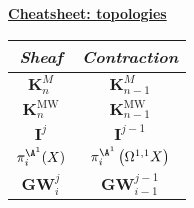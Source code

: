 \begin{mdframed}[style=cheatsheet]
\begin{center}

\underline{\textbf{Cheatsheet: topologies}}

        \begin{tabular}{| c | c |}
        \hline
        \textit{Sheaf} & \textit{Contraction} \\
        \hline
        $\mathbf{K}_n^M$ & $ \mathbf{K}_{n-1}^M$ \\
        $\mathbf{K}_n^\text{MW}$ & $ \mathbf{K}_{n-1}^\text{MW}$ \\
        $\mathbf{I}^j$ & $\mathbf{I}^{j-1}$ \\
        $\pi_i^{\A^1}(X)$ & $\pi_i^{\A^1} \left( \Omega^{1,1} X \right)$ \\
        $\mathbf{GW}_i^j$ & $\mathbf{GW}_{i-1}^{j-1}$ \\ %
        \hline
        \end{tabular}
\end{center}
\end{mdframed}

